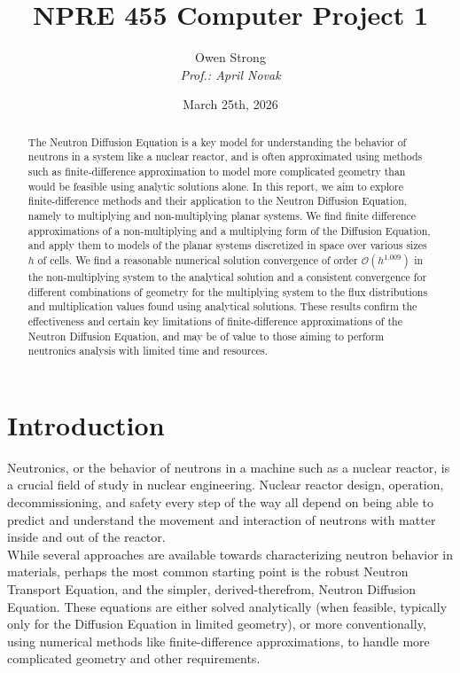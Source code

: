 \documentclass[12pt]{article}
\title{NPRE 455 Computer Project 1}
\author{Owen Strong \\
\itshape Prof.: April Novak\\
}
\date{March 25th, 2026}
\newcommand{\bigO}{\mathcal{O}}
\begin{document}
\maketitle
\pagebreak
{\hypersetup{linkcolor=black}\tableofcontents}
\pagebreak
{}
\begin{abstract}
    The Neutron Diffusion Equation is a key model for understanding the behavior of neutrons in a system like a nuclear reactor, and is often approximated using methods such as finite-difference approximation to model more complicated geometry than would be feasible using analytic solutions alone.
    In this report, we aim to explore finite-difference methods and their application to the Neutron Diffusion Equation, namely to multiplying and non-multiplying planar systems.
    We find finite difference approximations of a non-multiplying and a multiplying form of the Diffusion Equation, and apply them to models of the planar systems discretized in space over various sizes $h$ of cells.
    We find a reasonable numerical solution convergence of order $\bigO(h^{1.009})$ in the non-multiplying system to the analytical solution and a consistent convergence for different combinations of geometry for the multiplying system to the flux distributions and multiplication values found using analytical solutions.
    These results confirm the effectiveness and certain key limitations of finite-difference approximations of the Neutron Diffusion Equation, and may be of value to those aiming to perform neutronics analysis with limited time and resources.
\end{abstract}

\section{Introduction}
Neutronics, or the behavior of neutrons in a machine such as a nuclear reactor, is a crucial field of study in nuclear engineering.
Nuclear reactor design, operation, decommissioning, and safety every step of the way all depend on being able to predict and understand the movement and interaction of neutrons with matter inside and out of the reactor.\\

While several approaches are available towards characterizing neutron behavior in materials, perhaps the most common starting point is the robust Neutron Transport Equation, and the simpler, derived-therefrom, Neutron Diffusion Equation. 
These equations are either solved analytically (when feasible, typically only for the Diffusion Equation in limited geometry), or more conventionally, using numerical methods like finite-difference approximations, to handle more complicated geometry and other requirements.\\
\end{document}

